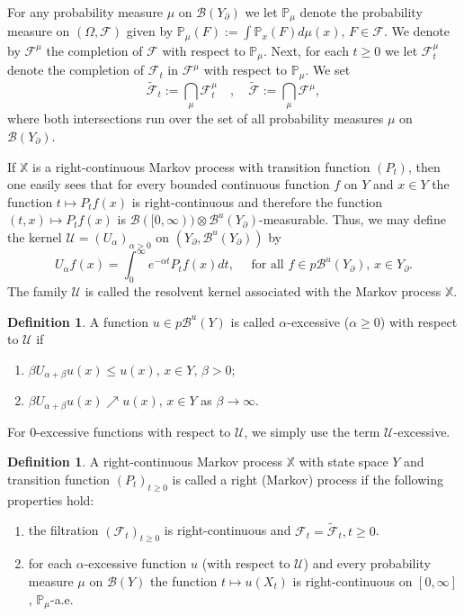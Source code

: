 \documentclass[11pt,a4paper,reqno]{amsart}
\theoremstyle{definition}
\newtheorem{definition}[theorem]{Definition}
\numberwithin{equation}{section}
\begin{document}
For any probability measure   $\mu$ on $\mathcal{B}(Y_\partial)$ we let 
$\mathbb P_\mu$ denote  the probability measure on $(\Omega, \mathcal{F})$ 
given by $\mathbb P_\mu(F):=\int \mathbb P_x(F) d \mu(x),\, F \in \mathcal{F}$. 
We denote by $\mathcal{F}^\mu$ the completion of $\mathcal{F}$ with respect to $\mathbb P_\mu$. 
Next,  for each $t \geq 0$ we let $\mathcal{F}_t^\mu$ denote the completion of $\mathcal{F}_t$
 in $\mathcal{F}^\mu$ with respect to $\mathbb P_\mu$. We set
$$
\widetilde{\mathcal{F}}_t:=\bigcap_\mu \mathcal{F}_t^\mu \quad, \quad \widetilde{\mathcal{F}}:=\bigcap_\mu \mathcal{F}^\mu,
$$
where both  intersections run over the set of all probability measures $\mu$ on $\mathcal{B}(Y_\partial)$.

If $\mathbb X$ is a right-continuous Markov process with transition function $(P_t)$, then 
one easily sees that for every 
bounded continuous function $f$ on $Y$   and $x \in Y$ the function $t \longmapsto P_t f(x)$
is right-continuous and therefore the function $(t, x) \longmapsto P_t f(x)$ is 
$\mathcal{B}([0, \infty)) \otimes \mathcal{B}^u(Y_\partial)$-measurable. 
Thus, we may define the kernel  $\mathcal{U}=\left(U_\alpha\right)_{\alpha>0}$ on $(Y_\partial, \mathcal{B}^u(Y_\partial))$
 by
$$
U_\alpha f(x)=\int_0^{\infty} e^{-\alpha t} P_t f(x) d t, \quad \text { for all } f \in p \mathcal{B}^u(Y_\partial),\, x\in Y_\partial.
$$
The family $\mathcal{U}$ is called the resolvent kernel associated with the Markov process $\mathbb X$.

\begin{definition}
A function $u\in p \mathcal{B}^u(Y)$ is called $\alpha$-excessive ($\alpha\ge 0$) with respect to $\mathcal U$ if
\begin{enumerate}
\item[(i)] $\beta U_{\alpha+\beta}u(x)\le u(x),\, x\in Y,\, \beta>0$;
\item[(ii)] $\beta U_{\alpha+\beta}u(x)\nearrow u(x),\, x\in Y$ as $\beta\to \infty$.
\end{enumerate}
\end{definition}
For $0$-excessive functions with respect to $\mathcal U$, we simply use the
term $\mathcal U$-excessive.

\begin{definition}
A right-continuous Markov process $\mathbb X$ with state space $Y$ and 
transition function $\left(P_t\right)_{t \geq 0}$ is called a right (Markov) process if the following properties hold:
\begin{enumerate}
\item[(i)] the filtration $\left(\mathcal{F}_t\right)_{t \geq 0}$ is right-continuous and  $\mathcal{F}_t=\widetilde{\mathcal{F}}_t, t\ge 0$.
\item[(ii)] for each $\alpha$-excessive function $u$ (with respect to $\mathcal{U}$) 
and every probability measure   $\mu$ on $\mathcal B(Y)$ the function $t \longmapsto u(X_t)$ is right-continuous on 
$[0, \infty]$, $\mathbb P_\mu$-a.e.
\end{enumerate}
\end{definition}
\end{document}
